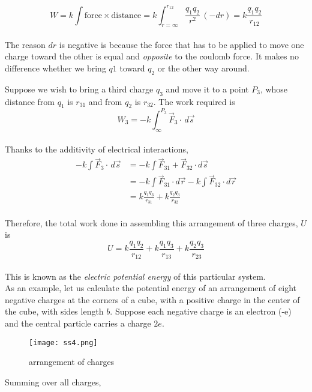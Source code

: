 \documentclass[svgnames]{article}
\begin{document}
\[ W = k \int \text{force} \times \text{distance} = k\int_{r = \infty}^{r_{12}}
\frac{q_1q_2}{r^2}\,(-dr) = k\frac{q_1q_2}{r_{12}} \] \\

The reason $dr$ is negative is because the force that has to be applied to move
one charge toward the other is equal and \textit{opposite} to the coulomb
force. It makes no difference whether we bring $q1$ toward $q_2$ or the other way around. 

Suppose we wish to bring a third charge $q_3$ and move it to a point $P_3$,
whose distance from $q_1$ is $r_{31}$ and from $q_2$ is $r_{32}$. The work required is \\

\[ W_3 = - k\int_\infty^{P_3} \vec{F}_3 \cdot \, d\vec{s}  \] \\

Thanks to the additivity of electrical interactions, \\ 
\begin{align*}
-k\int \vec{F}_3 \cdot \, d\vec{s} &= -k\int \vec{F}_{31} + \vec{F}_{32} \cdot d\vec{s} \\
&= -k\int \vec{F}_{31} \cdot d\vec{r} - k\int \vec{F}_{32} \cdot d\vec{r} \\ 
&= k\frac{q_1q_3}{r_{31}} + k\frac{q_2q_3}{r_{32}} 
\end{align*} \\ 

Therefore, the total work done in assembling this arrangement of three charges, $U$ is \\

\[ U = k\frac{q_1q_2}{r_{12}} + k\frac{q_1q_3}{r_{13}} +  k\frac{q_2q_3}{r_{23}} \] \\

This is known as the \textit{electric potential energy} of this particular system. \\

As an example, let us calculate the potential energy of an arrangement of eight
negative charges at the corners of a cube, with a positive charge in the center
of the cube, with sides length $b$. Suppose each negative charge is an electron
(-e) and the central particle carries a charge $2e$.

\begin{figure}[!hb]
  \centering
  \texttt{[image: ss4.png]}
  \caption{arrangement of charges}
\end{figure}

Summing over all charges, 
\end{document}
